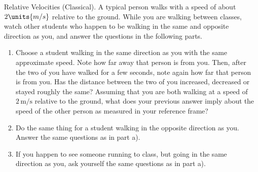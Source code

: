 \begin{aproblem}{Relative Velocities (Classical).}  
  A typical person walks with a speed of about $2\units{m/s}$
  relative to the ground.  While you are walking between classes,
  watch other students who happen to be walking in the same and
  opposite direction as you, and answer the questions in the following
  parts.
  \begin{enumerate}
  \item Choose a student walking in the same direction as you with the
    same approximate speed.  Note how far away that person is from
    you.  Then, after the two of you have walked for a few seconds,
    note again how far that person is from you.  Has the distance
    between the two of you increased, decreased or stayed roughly the
    same?  Assuming that you are both walking at a speed of $2\,
    \mbox{m/s}$ relative to the ground, what does your previous answer
    imply about the speed of the other person as measured in your
    reference frame?

  \item Do the same thing for a student walking in the opposite
    direction as you.  Answer the same questions as in part a).

  \item If you happen to see someone running to class, but going in
    the same direction as you, ask yourself the same questions as in
    part a).
  \end{enumerate}
\end{aproblem}

